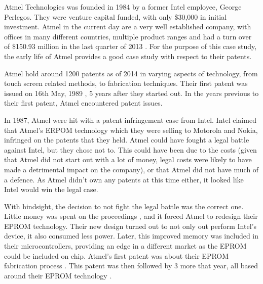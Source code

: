 
{}


Atmel Technologies was founded in 1984 by a former Intel employee, George Perlegos.
They were venture capital funded, with only \$30,000 in initial investment.
Atmel in the current day are a very well established company, with offices in many different countries, multiple product ranges and had a turn over of \$150.93 million in the last quarter of 2013 \cite{atmel:profit}.
For the purpose of this case study, the early life of Atmel provides a good case study with respect to their patents.


Atmel hold around 1200 patents as of 2014 \cite{atmel:patents} in varying aspects of technology, from touch screen related methods, to fabrication techniques.
Their first patent was issued on 16th May, 1989 \cite{atmel:eprompatent}, 5 years after they started out.
In the years previous to their first patent, Atmel encountered patent issues.

In 1987, Atmel were hit with a patent infringement case from Intel.
Intel claimed that Atmel's ERPOM technology which they were selling to Motorola and Nokia, infringed on the patents that they held.
Atmel could have fought a legal battle against Intel, but they chose not to. 
This could have been due to the costs (given that Atmel did not start out with a lot of money, legal costs were likely to have made a detrimental impact on the company), or that Atmel did not have much of a defence.
As Atmel didn't own any patents at this time either, it looked like Intel would win the legal case. 

With hindsight, the decision to not fight the legal battle was the correct one. 
Little money was spent on the proceedings , and it forced Atmel to redesign their EPROM technology.
Their new design turned out to not only out perform Intel's device, it also consumed less power.
Later, this improved memory was included in their microcontrollers, providing an edge in a different market as the EPROM could be included on chip.
Atmel's first patent was about their EPROM fabrication process \cite{atmel:eprompatent}.
This patent was then followed by 3 more that year, all based around their EPROM technology \cite{atmel:eprom1,atmel:eprom2,atmel:eprom3}.

